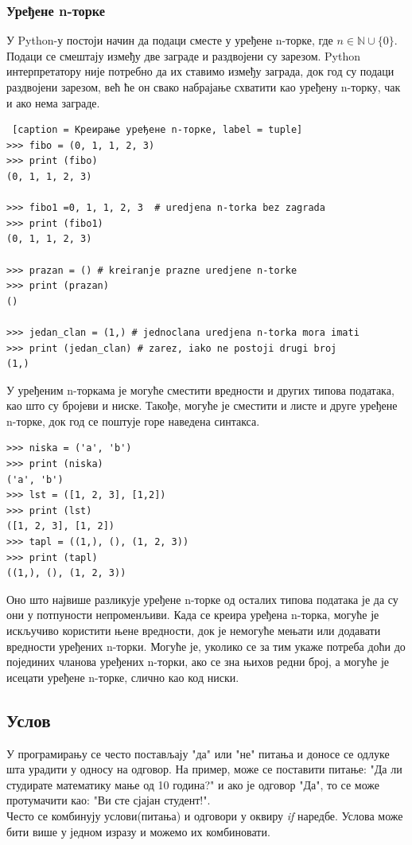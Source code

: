 \documentclass[11pt, serbianc, english, titlepage]{article}
\begin{document}
		\subsubsection{Уређене n-торке}
		У Python-у постоји начин да подаци сместе у уређене n-торке, где $n \in \mathbb{N}\cup\{0\}$. Подаци се смештају између две заграде и раздвојени су зарезом. Python интерпретатору није потребно да их ставимо између заграда, док год су подаци раздвојени зарезом, већ ће он свако набрајање схватити као уређену n-торку, чак и ако нема заграде. 
		\begin{lstlisting} [caption = Креирање уређене n-торке, label = tuple]
>>> fibo = (0, 1, 1, 2, 3)
>>> print (fibo)
(0, 1, 1, 2, 3)

>>> fibo1 =0, 1, 1, 2, 3  # uredjena n-torka bez zagrada
>>> print (fibo1)
(0, 1, 1, 2, 3)		  
		
>>> prazan = () # kreiranje prazne uredjene n-torke
>>> print (prazan)
()

>>> jedan_clan = (1,) # jednoclana uredjena n-torka mora imati
>>> print (jedan_clan) # zarez, iako ne postoji drugi broj
(1,)
		\end{lstlisting}
		\pagebreak
		У уређеним n-торкама је могуће сместити вредности и других типова података, као што су бројеви и ниске. Такође, могуће је сместити и листе и друге уређене n-торке, док год се поштује горе наведена синтакса. 
		\begin{lstlisting}[caption = Уређене n-торке могу садржати и ниске и  листе и друге уређене n-торке, label = str_lst_tuple]
>>> niska = ('a', 'b')
>>> print (niska)
('a', 'b')
>>> lst = ([1, 2, 3], [1,2])
>>> print (lst)
([1, 2, 3], [1, 2])
>>> tapl = ((1,), (), (1, 2, 3))
>>> print (tapl)
((1,), (), (1, 2, 3))
		\end{lstlisting}
		Оно што највише разликује уређене n-торке од осталих типова података је да су они у потпуности непроменљиви. Када се креира уређена n-торка, могуће је искључиво користити њене вредности, док је немогуће мењати или додавати вредности уређених n-торки. Могуће је, уколико се за тим укаже потреба доћи  до појединих чланова уређених n-торки, ако се зна њихов редни број, а могуће је исецати уређене n-торке, слично као код ниски. 
		\subsection{Услов}
		У програмирању се често постављају "да" или "не" питања и доносе се одлуке шта урадити у односу на одговор. На пример, може се поставити питање: "Да ли студирате математику мање од 10 година?" и ако је одговор "Да", то се може протумачити као: "Ви сте сјајан студент!".\\
		Често се комбинују услови(питања) и одговори у оквиру \emph{if} наредбе. Услова може бити више у једном изразу и можемо их комбиновати. 
		
\end{document}
